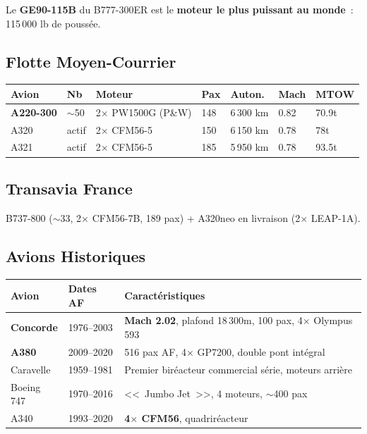 \documentclass[11pt,a4paper]{article}
\begin{document}
\begin{tipbox}
Le \textbf{GE90-115B} du B777-300ER est le \textbf{moteur le plus puissant au monde}~: 115\,000 lb de poussée.
\end{tipbox}

\subsection{Flotte Moyen-Courrier}

\begin{tabular}{p{3cm}p{1.5cm}p{3cm}p{1.5cm}p{1.5cm}p{1.5cm}p{1.5cm}}
\toprule
\textbf{Avion} & \textbf{Nb} & \textbf{Moteur} & \textbf{Pax} & \textbf{Auton.} & \textbf{Mach} & \textbf{MTOW} \\
\midrule
\rowcolor{aflight}
\textbf{A220-300} & $\sim$50 & 2$\times$ PW1500G (P\&W) & 148 & 6\,300 km & 0.82 & 70.9t \\
A320 & actif & 2$\times$ CFM56-5 & 150 & 6\,150 km & 0.78 & 78t \\
A321 & actif & 2$\times$ CFM56-5 & 185 & 5\,950 km & 0.78 & 93.5t \\
\bottomrule
\end{tabular}

\subsection{Transavia France}
B737-800 ($\sim$33, 2$\times$ CFM56-7B, 189 pax) + A320neo en livraison (2$\times$ LEAP-1A).

\subsection{Avions Historiques}

\begin{tabular}{p{3cm}p{2cm}p{9.5cm}}
\toprule
\textbf{Avion} & \textbf{Dates AF} & \textbf{Caractéristiques} \\
\midrule
\textbf{Concorde} & 1976--2003 & \textbf{Mach 2.02}, plafond 18\,300m, 100 pax, 4$\times$ Olympus 593 \\
\textbf{A380} & 2009--2020 & 516 pax AF, 4$\times$ GP7200, double pont intégral \\
Caravelle & 1959--1981 & Premier biréacteur commercial série, moteurs arrière \\
Boeing 747 & 1970--2016 & <<~Jumbo Jet~>>, 4 moteurs, $\sim$400 pax \\
A340 & 1993--2020 & \textbf{4$\times$ CFM56}, quadriréacteur \\
\bottomrule
\end{tabular}
\end{document}
